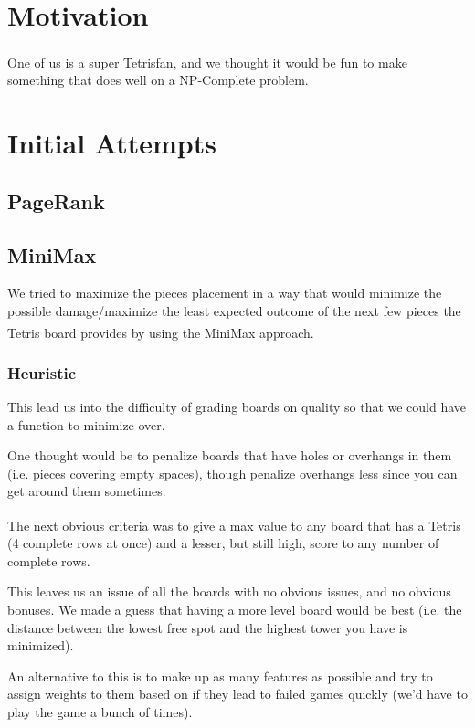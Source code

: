 \documentclass{article}
\def\tetris{Tetris\textsuperscript{\textregistered}}
\begin{document}
\section{Motivation}
\label{sec:motivation}
One of us is a super \tetris{}fan, and we thought it would be fun to make something that does well on a NP-Complete problem.


\section{Initial Attempts}
\label{sec:initial_attempts}



\subsection{PageRank}

\subsection{MiniMax}
\par We tried to maximize the pieces placement in a way that would minimize the possible damage/maximize the least expected outcome of the next few pieces the \tetris{} board provides by using the MiniMax approach.
\subsubsection{Heuristic}
\par This lead us into the difficulty of grading boards on quality so that we could have a function to minimize over.

\par One thought would be to penalize boards that have holes or overhangs in them (i.e. pieces covering empty spaces), though penalize overhangs less since you can get around them sometimes.

\par The next obvious criteria was to give a max value to any board that has a \tetris{} (4 complete rows at once) and a lesser, but still high, score to any number of complete rows.

\par This leaves us an issue of all the boards with no obvious issues, and no obvious bonuses. We made a guess that having a more level board would be best (i.e. the distance between the lowest free spot and the highest tower you have is minimized).

\par An alternative to this is to make up as many features as possible and try to assign weights to them based on if they lead to failed games quickly (we'd have to play the game a bunch of times).
\end{document}
